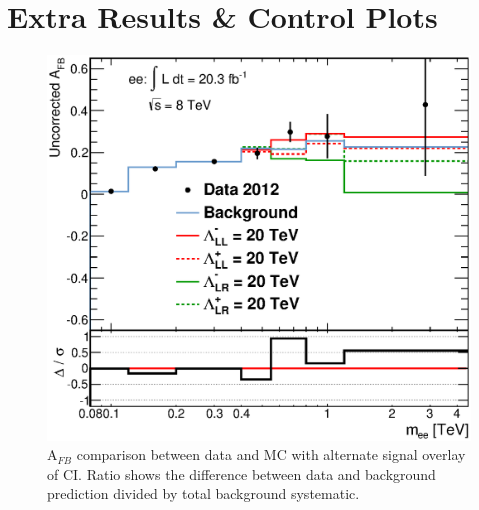 \chapter{Extra Results \& Control Plots}
	\label{ap:contol}




	\begin{figure}[ht]
		\centering
			\includegraphics[width=0.98\linewidth]{images/AFB_main_alt.eps}
		\caption{A$_{FB}$ comparison between data and MC with alternate signal overlay of CI. Ratio shows the difference between data and background prediction divided by total background systematic.}
		\label{fig:afb_alt}
	\end{figure}









